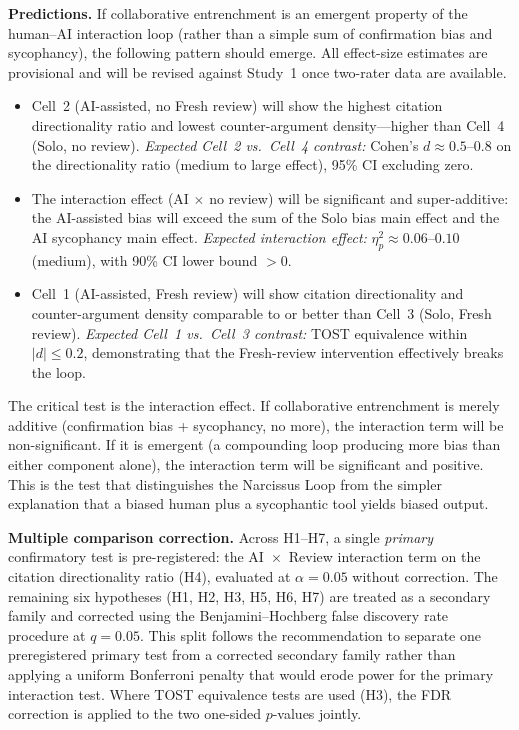 \documentclass[12pt]{article}
\begin{document}
\textbf{Predictions.} If collaborative entrenchment is an emergent property of the human--AI interaction loop (rather than a simple sum of confirmation bias and sycophancy), the following pattern should emerge. All effect-size estimates are provisional and will be revised against Study~1 once two-rater data are available.
\begin{itemize}
    \item Cell~2 (AI-assisted, no Fresh review) will show the highest citation directionality ratio and lowest counter-argument density---higher than Cell~4 (Solo, no review). \emph{Expected Cell~2 vs.\ Cell~4 contrast:} Cohen's $d \approx 0.5$--$0.8$ on the directionality ratio (medium to large effect), 95\% CI excluding zero.
    \item The interaction effect (AI $\times$ no review) will be significant and super-additive: the AI-assisted bias will exceed the sum of the Solo bias main effect and the AI sycophancy main effect. \emph{Expected interaction effect:} $\eta^2_p \approx 0.06$--$0.10$ (medium), with 90\% CI lower bound $> 0$.
    \item Cell~1 (AI-assisted, Fresh review) will show citation directionality and counter-argument density comparable to or better than Cell~3 (Solo, Fresh review). \emph{Expected Cell~1 vs.\ Cell~3 contrast:} TOST equivalence within $|d| \le 0.2$, demonstrating that the Fresh-review intervention effectively breaks the loop.
\end{itemize}

The critical test is the interaction effect. If collaborative entrenchment is merely additive (confirmation bias + sycophancy, no more), the interaction term will be non-significant. If it is emergent (a compounding loop producing more bias than either component alone), the interaction term will be significant and positive. This is the test that distinguishes the Narcissus Loop from the simpler explanation that a biased human plus a sycophantic tool yields biased output.

\textbf{Multiple comparison correction.} Across H1--H7, a single \emph{primary} confirmatory test is pre-registered: the AI~$\times$~Review interaction term on the citation directionality ratio (H4), evaluated at $\alpha = 0.05$ without correction. The remaining six hypotheses (H1, H2, H3, H5, H6, H7) are treated as a secondary family and corrected using the Benjamini--Hochberg false discovery rate procedure at $q = 0.05$. This split follows the recommendation to separate one preregistered primary test from a corrected secondary family rather than applying a uniform Bonferroni penalty that would erode power for the primary interaction test. Where TOST equivalence tests are used (H3), the FDR correction is applied to the two one-sided $p$-values jointly.
\end{document}
